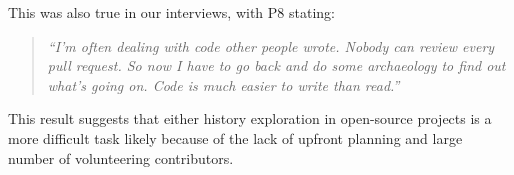 This was also true in our interviews, with P8 stating:

\begin{quotation}
\textit{``I'm often dealing with code other people wrote. Nobody can review every pull request. So now I have to go back and do some archaeology to find out what's going on. Code is much easier to write than read.''}
\end{quotation}

This result suggests that either history exploration in open-source projects is a more difficult task likely because of the lack of upfront planning and large number of volunteering contributors.

